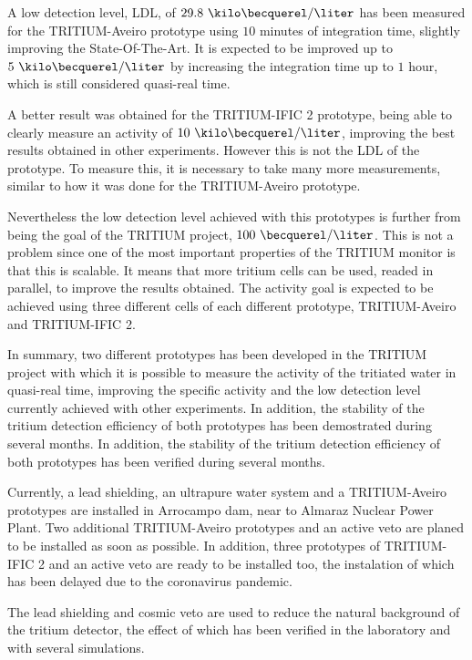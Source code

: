 A low detection level, LDL, of $29.8~\kilo\becquerel/\liter$ has been measured for the TRITIUM-Aveiro prototype using $10$ minutes of integration time, slightly improving the State-Of-The-Art. It is expected to be improved up to $5~\kilo\becquerel/\liter$ by increasing the integration time up to $1$ hour, which is still considered quasi-real time.

A better result was obtained for the TRITIUM-IFIC 2 prototype, being able to clearly measure an activity of $10~\kilo\becquerel/\liter$, improving the best results obtained in other experiments. However this is not the LDL of the prototype. To measure this, it is necessary to take many more measurements, similar to how it was done for the TRITIUM-Aveiro prototype.

Nevertheless the low detection level achieved with this prototypes is further from being the goal of the TRITIUM project, $100~\becquerel/\liter$. This is not a problem since one of the most important properties of the TRITIUM monitor is that this is scalable. It means that more tritium cells can be used, readed in parallel, to improve the results obtained. The activity goal is expected to be achieved using three different cells of each different prototype, TRITIUM-Aveiro and TRITIUM-IFIC 2.

In summary, two different prototypes has been developed in the TRITIUM project with which it is possible to measure the activity of the tritiated water in quasi-real time, improving the specific activity and the low detection level currently achieved with other experiments. In addition, the stability of the tritium detection efficiency of both prototypes has been demostrated during several months. In addition, the stability of the tritium detection efficiency of both prototypes has been verified during several months.

Currently, a lead shielding, an ultrapure water system and a TRITIUM-Aveiro prototypes are installed in Arrocampo dam, near to Almaraz Nuclear Power Plant. Two additional TRITIUM-Aveiro prototypes and an active veto are planed to be installed as soon as possible. In addition, three prototypes of TRITIUM-IFIC 2 and an active veto are ready to be installed too, the instalation of which has been delayed due to the coronavirus pandemic.

The lead shielding and cosmic veto are used to reduce the natural background of the tritium detector, the effect of which has been verified in the laboratory and with several simulations.

